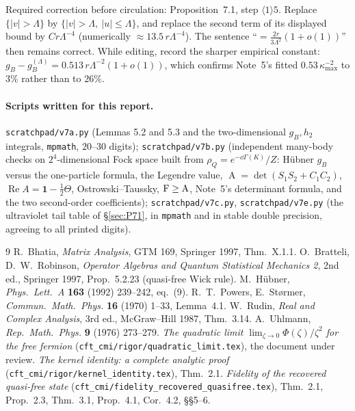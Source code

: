 \documentclass[11pt]{article}
\newcommand{\abs}[1]{\left|#1\right|}
\newcommand{\one}{\mathbf 1}
\newcommand{\Hell}{\operatorname{A}}
\theoremstyle{definition}\newtheorem{problem}[theorem]{Problem}
\begin{document}
\begin{verdictbreak}
Required correction before circulation: Proposition~7.1, step \(\langle1\rangle5\).  Replace
\(\{\abs v>\Lambda\}\) by \(\{\abs v>\Lambda,\ \abs u\le\Lambda\}\), and replace the second term of
its displayed bound by \(C r\Lambda^{-4}\) (numerically \(\approx13.5\,r\Lambda^{-4}\)).  The
sentence ``\(=\frac{2r}{3\Lambda^2}(1+o(1))\)'' then remains correct.  While editing, record the
sharper empirical constant: \(g_B-g_B^{(\Lambda)}=0.513\,r\Lambda^{-2}(1+o(1))\), which confirms
Note~5's fitted \(0.53\,\kappa_{\max}^{-2}\) to \(3\%\) rather than to \(26\%\).
\end{verdictbreak}

\paragraph{Scripts written for this report.}
\texttt{scratchpad/v7a.py} (Lemmas 5.2 and 5.3 and the two-dimensional \(g_B,h_2\) integrals,
\texttt{mpmath}, \(20\)--\(30\) digits);
\texttt{scratchpad/v7b.py} (independent many-body checks on \(2^4\)-dimensional Fock space built
from \(\rho_Q=e^{-\dd\Gamma(K)}/Z\): H\"ubner \(g_B\) versus the one-particle formula, the Legendre
value, \(\Hell=\det(S_1S_2+C_1C_2)\), \(\operatorname{Re}A=\one-\frac12\Theta\),
Ostrowski--Taussky, \(\Fid\ge\Hell\), Note~5's determinant formula, and the two second-order
coefficients);
\texttt{scratchpad/v7c.py}, \texttt{scratchpad/v7e.py} (the ultraviolet tail table of
\S\ref{sec:P71}, in \texttt{mpmath} and in stable double precision, agreeing to all printed digits).

\begin{thebibliography}{9}\footnotesize
{} R.~Bhatia, \emph{Matrix Analysis}, GTM 169, Springer 1997, Thm.~X.1.1.
 O.~Bratteli, D.~W.~Robinson, \emph{Operator Algebras and Quantum Statistical
 Mechanics 2}, 2nd ed., Springer 1997, Prop.~5.2.23 (quasi-free Wick rule).
 M.~H\"ubner, \emph{Phys.\ Lett.\ A} \textbf{163} (1992) 239--242, eq.~(9).
 R.~T.~Powers, E.~St\o rmer, \emph{Commun.\ Math.\ Phys.} \textbf{16} (1970) 1--33,
 Lemma~4.1.
 W.~Rudin, \emph{Real and Complex Analysis}, 3rd ed., McGraw--Hill 1987, Thm.~3.14.
 A.~Uhlmann, \emph{Rep.\ Math.\ Phys.} \textbf{9} (1976) 273--279.
 \emph{The quadratic limit \(\lim_{\zeta\to0}\Phi(\zeta)/\zeta^2\) for the free fermion}
 (\texttt{cft\_cmi/rigor/quadratic\_limit.tex}), the document under review.
 \emph{The kernel identity: a complete analytic proof}
 (\texttt{cft\_cmi/rigor/kernel\_identity.tex}), Thm.~2.1.
 \emph{Fidelity of the recovered quasi-free state}
 (\texttt{cft\_cmi/fidelity\_recovered\_quasifree.tex}), Thm.~2.1, Prop.~2.3, Thm.~3.1, Prop.~4.1,
 Cor.~4.2, \S\S5--6.
\end{thebibliography}
\end{document}
